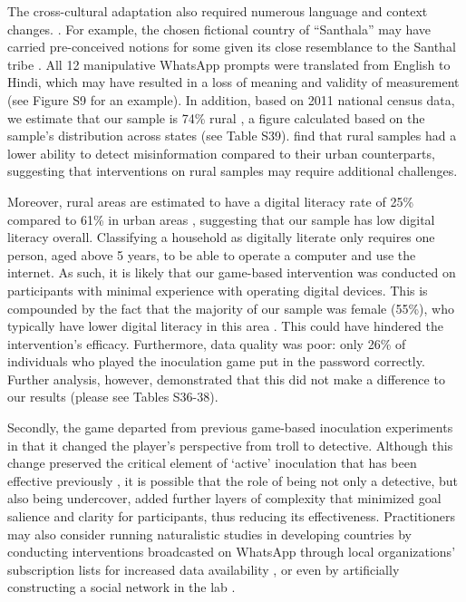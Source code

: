 \documentclass[empirical, authordate]{jote-new-article}
\begin{document}
The cross-cultural adaptation also required numerous language and context changes. \parencite{Roozenbeek2020}. For example, the chosen fictional country of “Santhala” may have carried pre-conceived notions for some given its close resemblance to the Santhal tribe \parencite{EncyclopaediaBritannica2012}. All 12 manipulative \mbox{WhatsApp} prompts were translated from English to Hindi, which may have resulted in a loss of meaning and validity of measurement (see Figure S9 for an example). In addition, based on 2011 national census data, we estimate that our sample is 74\% rural \parencite{India2016}, a figure calculated based on the sample's distribution across states (see Table S39). \textcite{Shahid2022} find that rural samples had a lower ability to detect misinformation compared to their urban counterparts, suggesting that interventions on rural samples may require additional challenges.

Moreover, rural areas are estimated to have a digital literacy rate of 25\% compared to 61\% in urban areas \parencite{Mothkoor2021}, suggesting that our sample has low digital literacy overall. Classifying a household as digitally literate only requires one person, aged above 5 years, to be able to operate a computer and use the internet. As such, it is likely that our game-based intervention was conducted on participants with minimal experience with operating digital devices. This is compounded by the fact that the majority of our sample was female (55\%), who typically have lower digital literacy in this area \parencite{Rowntree2020}. This could have hindered the intervention's efficacy. Furthermore, data quality was poor: only 26\% of individuals who played the inoculation game put in the password correctly. Further analysis, however, demonstrated that this did not make a difference to our results (please see Tables S36-38).

Secondly, the game departed from previous game-based inoculation experiments in that it changed the player's perspective from troll to detective. Although this change preserved the critical element of ‘active' inoculation that has been effective previously \parencite{Pfau2005,Roozenbeek2019}, it is possible that the role of being not only a detective, but also being undercover, added further layers of complexity that minimized goal salience and clarity for participants, thus reducing its effectiveness. Practitioners may also consider running naturalistic studies in developing countries by conducting interventions broadcasted on \mbox{WhatsApp} through local organizations' subscription lists for increased data availability \parencite{Bowles2020}, or even by artificially constructing a social network in the lab \parencite{Pogorelskiy2017}.
\end{document}
